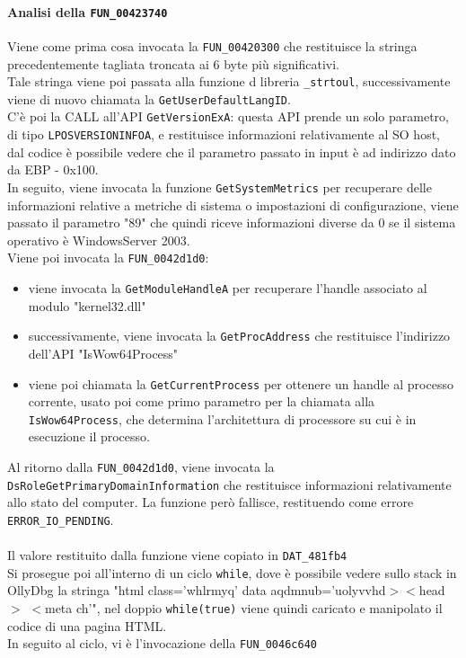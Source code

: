 \documentclass[12pt]{extarticle}
\begin{document}
\paragraph{Analisi della \texttt{FUN\_00423740}}
Viene come prima cosa invocata la \texttt{FUN\_00420300} che restituisce la stringa precedentemente tagliata troncata ai 6 byte più significativi.\\Tale stringa viene poi passata alla funzione d libreria \texttt{\_strtoul}, successivamente viene di nuovo chiamata la \texttt{GetUserDefaultLangID}.\\C'è poi la CALL all'API \texttt{GetVersionExA}: questa API prende un solo parametro, di tipo \texttt{LPOSVERSIONINFOA}, e restituisce informazioni relativamente al SO host, dal codice è possibile vedere che il parametro passato in input è ad indirizzo dato da EBP - 0x100.\\In seguito, viene invocata la funzione \texttt{GetSystemMetrics} per recuperare delle informazioni relative a metriche di sistema o impostazioni di configurazione, viene passato il parametro "89" che quindi riceve informazioni diverse da 0 se il sistema operativo è WindowsServer 2003.\\Viene poi invocata la \texttt{FUN\_0042d1d0}:
\begin{itemize}
    \item viene invocata la \texttt{GetModuleHandleA} per recuperare l'handle associato al modulo "kernel32.dll"
    \item successivamente, viene invocata la \texttt{GetProcAddress} che restituisce l'indirizzo dell'API "IsWow64Process"
    \item viene poi chiamata la \texttt{GetCurrentProcess} per ottenere un handle al processo corrente, usato poi come primo parametro per la chiamata alla \texttt{IsWow64Process}, che determina l'architettura di processore su cui è in esecuzione il processo.
\end{itemize}
Al ritorno dalla \texttt{FUN\_0042d1d0}, viene invocata la \texttt{DsRoleGetPrimaryDomainInformation} che restituisce informazioni relativamente allo stato del computer. La funzione però fallisce, restituendo come errore \texttt{ERROR\_IO\_PENDING}.
\\\\Il valore restituito dalla funzione viene copiato in \texttt{DAT\_481fb4}\\Si prosegue poi all'interno di un ciclo \texttt{while}, dove è possibile vedere sullo stack in OllyDbg la stringa "html class='whlrmyq' data aqdmnub='uolyvvhd$>$$<$head$>$ $<$meta ch'", nel doppio \texttt{while(true)} viene quindi caricato e manipolato il codice di una pagina HTML.\\In seguito al ciclo, vi è l'invocazione della \texttt{FUN\_0046c640}
\end{document}
